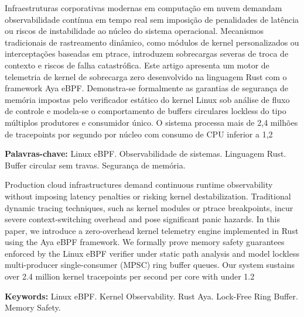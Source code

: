 \documentclass[
  article,
  12pt,
  oneside,
  a4paper,
  english,
  brazil
]{abntex2}
\begin{document}

\maketitle

\begin{resumoumacoluna}
Infraestruturas corporativas modernas em computação em nuvem demandam observabilidade contínua em tempo real sem imposição de penalidades de latência ou riscos de instabilidade ao núcleo do sistema operacional. Mecanismos tradicionais de rastreamento dinâmico, como módulos de kernel personalizados ou interceptações baseadas em ptrace, introduzem sobrecargas severas de troca de contexto e riscos de falha catastrófica. Este artigo apresenta um motor de telemetria de kernel de sobrecarga zero desenvolvido na linguagem Rust com o framework Aya eBPF. Demonstra-se formalmente as garantias de segurança de memória impostas pelo verificador estático do kernel Linux sob análise de fluxo de controle e modela-se o comportamento de buffers circulares lockless do tipo múltiplos produtores e consumidor único. O sistema processa mais de 2,4 milhões de tracepoints por segundo por núcleo com consumo de CPU inferior a 1,2%

\vspace{\onelineskip}
\noindent
\textbf{Palavras-chave:} Linux eBPF. Observabilidade de sistemas. Linguagem Rust. Buffer circular sem travas. Segurança de memória.
\end{resumoumacoluna}

\begin{resumoumacoluna}[Abstract]
Production cloud infrastructures demand continuous runtime observability without imposing latency penalties or risking kernel destabilization. Traditional dynamic tracing techniques, such as kernel modules or ptrace breakpoints, incur severe context-switching overhead and pose significant panic hazards. In this paper, we introduce a zero-overhead kernel telemetry engine implemented in Rust using the Aya eBPF framework. We formally prove memory safety guarantees enforced by the Linux eBPF verifier under static path analysis and model lockless multi-producer single-consumer (MPSC) ring buffer queues. Our system sustains over 2.4 million kernel tracepoints per second per core with under 1.2%

\vspace{\onelineskip}
\noindent
\textbf{Keywords:} Linux eBPF. Kernel Observability. Rust Aya. Lock-Free Ring Buffer. Memory Safety.
\end{resumoumacoluna}
\end{document}
